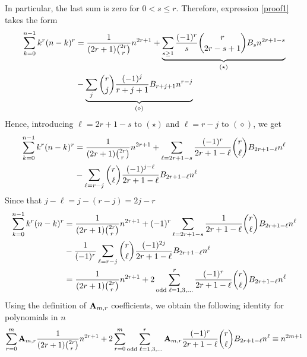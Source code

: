 \documentclass[12pt,letterpaper,oneside,reqno]{amsart}
\newcommand \bernoulli [2][B] {{#1}\sb{#2}}
\newcommand \coeffA [3][A] {{\mathbf{#1}} \sb{#2,#3}}
\numberwithin{equation}{section}
\begin{document}
    In particular, the last sum is zero for $0<s\leq r$.
    Therefore, expression \eqref{proof1} takes the form
    \begin{equation*}
        \begin{split}
            \sum_{k=0}^{n-1} k^r (n-k)^r
            &=\frac{1}{(2r+1) \binom{2r}{r}} n^{2r+1}
            +\underbrace{\sum_{s \geq 1} \frac{(-1)^r}{s} \binom{r}{2r-s+1} \bernoulli{s} n^{2r+1-s}}_{(\star)} \\
            &-\underbrace{\sum_{j} \binom{r}{j} \frac{(-1)^j}{r+j+1} \bernoulli{r+j+1} n^{r-j}}_{(\diamond)}
        \end{split}
    \end{equation*}
    Hence, introducing $\ell=2r+1-s$ to $(\star)$ and $\ell=r-j$ to $(\diamond)$, we get
    \begin{equation*}
        \begin{split}
            \sum_{k=0}^{n-1} k^r (n-k)^r
            &=\frac{1}{(2r+1) \binom{2r}{r}} n^{2r+1}
            +\sum_{\ell = 2r+1-s} \frac{(-1)^r}{2r+1-\ell} \binom{r}{\ell} \bernoulli{2r+1-\ell} n^{\ell} \\
            &-\sum_{\ell = r-j} \binom{r}{\ell} \frac{(-1)^{j-\ell}}{2r+1-\ell} \bernoulli{2r+1-\ell} n^{\ell}
        \end{split}
    \end{equation*}
    Since that $j-\ell=j-(r-j)=2j-r$
    \begin{equation*}
        \begin{split}
            \sum_{k=0}^{n-1} k^r (n-k)^r
            &=\frac{1}{(2r+1) \binom{2r}{r}} n^{2r+1}
            +(-1)^{r} \sum_{\ell = 2r+1-s} \frac{1}{2r+1-\ell} \binom{r}{\ell} \bernoulli{2r+1-\ell} n^{\ell} \\
            &-\frac{1}{(-1)^{r}} \sum_{\ell = r-j} \binom{r}{\ell} \frac{(-1)^{2j}}{2r+1-\ell} \bernoulli{2r+1-\ell} n^{\ell} \\
            &=\frac{1}{(2r+1) \binom{2r}{r}}n^{2r+1}
            +2 \sum_{\text{odd } \ell = 1,3,\ldots}^{r} \frac{(-1)^r}{2r+1-\ell} \binom{r}{\ell} \bernoulli{2r+1-\ell} n^{\ell}
        \end{split}
    \end{equation*}
    Using the definition of $\coeffA{m}{r}$ coefficients, we obtain the following identity for polynomials in $n$
    \begin{equation}
        \label{proof2}
        \sum_{r=0}^{m} \coeffA{m}{r} \frac{1}{(2r+1) \binom{2r}{r}} n^{2r+1}
        +2 \sum_{r=0}^{m}\sum_{\text{odd } \ell = 1,3,\ldots}^{r} \coeffA{m}{r} \frac{(-1)^r}{2r+1-\ell}
        \binom{r}{\ell} \bernoulli{2r+1-\ell} n^{\ell}
        \equiv
        n^{2m+1}
    \end{equation}
\end{document}
